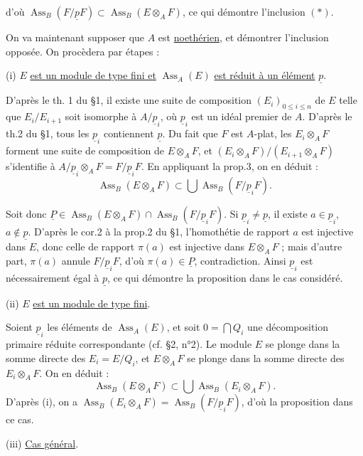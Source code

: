 
d'où $\operatorname{Ass}_B(F/\underline pF)\subset\operatorname{Ass}_B(E\otimes_A F)$, ce qui démontre l'inclusion $(\ast)$.

On va maintenant supposer que $A$ est \uline{noethérien}, et démontrer l'inclusion
opposée. On procèdera par étapes :

(i) $E$ \uline{est un module de type fini et} $\operatorname{Ass}_A(E)$ \uline{est réduit à un élément} $\underline p$.

D'après le th. 1 du §1, il existe une suite de composition $(E_i)_{0\leq i\leq n}$ de
$E$ telle que $E_i/E_{i+1}$ soit isomorphe à $A/\underline p_i$, où $\underline p_i$ est un idéal premier de $A$.
D'après le th.2 du §1, tous les $\underline p_i$ contiennent $\underline p$. Du fait que $F$ est $A$-plat,
les $E_i\otimes_A F$ forment une suite de composition de $E\otimes_A F$, et
$(E_i\otimes_A F)/(E_{i+1}\otimes_A F)$ s'identifie à $A/\underline p_i\otimes_A F=F/\underline p_iF$. En appliquant la
prop.3, on en déduit :
\[
\operatorname{Ass}_B(E\otimes_A F)\subset\bigcup\operatorname{Ass}_B(F/\underline p_iF).
\]

Soit donc $\underline P\in\operatorname{Ass}_B(E\otimes_A F)\cap\operatorname{Ass}_B(F/\underline p_iF)$. Si $\underline p_i\ne\underline p$, il existe $a\in\underline p_i$,
$a\notin\underline p$. D'après le cor.2 à la prop.2 du §1, l'homothétie de
rapport $a$ est injective dans $E$, donc celle de rapport $\pi(a)$ est injective
dans $E\otimes_A F$ ; mais d'autre part, $\pi(a)$ annule $F/\underline p_iF$, d'où $\pi(a)\in\underline P$, contradiction.
Ainsi $\underline p_i$ est nécessairement égal à $\underline p$, ce qui démontre la proposition dans le cas considéré.

(ii) $E$ \uline{est un module de type fini}.

Soient $\underline p_i$ les éléments de $\operatorname{Ass}_A(E)$, et soit $0=\bigcap Q_i$ une décomposition
primaire réduite correspondante (cf. §2, n°2). Le module $E$ se plonge dans
la somme directe des $E_i=E/Q_i$, et $E\otimes_A F$ se plonge dans la somme directe
des $E_i\otimes_A F$. On en déduit :
\[
\operatorname{Ass}_B(E\otimes_A F)\subset\bigcup\operatorname{Ass}_B(E_i\otimes_A F).
\]
D'après (i), on a $\operatorname{Ass}_B(E_i\otimes_A F)=\operatorname{Ass}_B(F/\underline p_iF)$, d'où la proposition dans
ce cas.

(iii) \uline{Cas général}.


